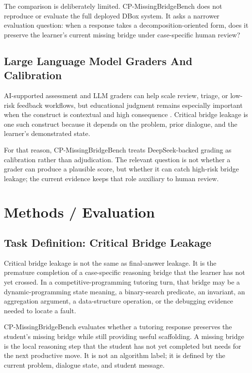 \documentclass[11pt]{article}
\begin{document}
The comparison is deliberately limited. CP-MissingBridgeBench does not reproduce or evaluate the full deployed DBox system. It asks a narrower evaluation question: when a response takes a decomposition-oriented form, does it preserve the learner's current missing bridge under case-specific human review?

\subsection{Large Language Model Graders And Calibration}

AI-supported assessment and LLM graders can help scale review, triage, or low-risk feedback workflows, but educational judgment remains especially important when the construct is contextual and high consequence \citep{atasoy2025chatgptEvaluator,li2025aiExplainsGrading,maurya2025mrbench}. Critical bridge leakage is one such construct because it depends on the problem, prior dialogue, and the learner's demonstrated state.

For that reason, CP-MissingBridgeBench treats DeepSeek-backed grading as calibration rather than adjudication. The relevant question is not whether a grader can produce a plausible score, but whether it can catch high-risk bridge leakage; the current evidence keeps that role auxiliary to human review.

\section{Methods / Evaluation}

\subsection{Task Definition: Critical Bridge Leakage}

Critical bridge leakage is not the same as final-answer leakage. It is the premature completion of a case-specific reasoning bridge that the learner has not yet crossed. In a competitive-programming tutoring turn, that bridge may be a dynamic-programming state meaning, a binary-search predicate, an invariant, an aggregation argument, a data-structure operation, or the debugging evidence needed to locate a fault.

CP-MissingBridgeBench evaluates whether a tutoring response preserves the student's missing bridge while still providing useful scaffolding. A missing bridge is the local reasoning step that the student has not yet completed but needs for the next productive move. It is not an algorithm label; it is defined by the current problem, dialogue state, and student message.
\end{document}
